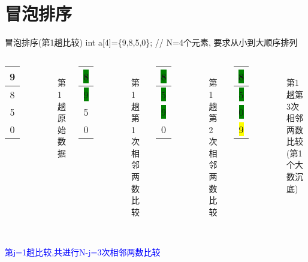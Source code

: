 \section{冒泡排序}

\begin{frame}{冒泡排序(第1趟比较)}
int a[4]=\{9,8,5,0\}; // N=4个元素, 要求从小到大顺序排列
\begin{columns}[T]
	\begin{tabular}{|c|}
		\hline 
		9 \\ 
		\hline 
		8 \\ 
		\hline 
		5 \\ 
		\hline
		0 \\
	    \hline 
	\end{tabular}\\ 
    第1趟原始数据
	\pause
	\begin{tabular}{|c|}
		\hline 
		\colorbox{green}{8} \\ 
		\hline 
		\colorbox{green}{9} \\ 
		\hline 
		5 \\ 
		\hline
		0 \\
		\hline  
	\end{tabular}\\ 
    第1趟第1次相邻两数比较
    \pause
    \begin{tabular}{|c|}
    	\hline 
    	\colorbox{green}{8} \\ 
    	\hline 
    	\colorbox{green}{5} \\ 
    	\hline 
    	\colorbox{green}{9} \\ 
    	\hline 
    	0 \\
    	\hline 
    \end{tabular}\\ 
    第1趟第2次相邻两数比较
    \pause
    \begin{tabular}{|c|}
    	\hline 
    	\colorbox{green}{8} \\ 
    	\hline 
    	\colorbox{green}{5} \\ 
    	\hline 
    	\colorbox{green}{0} \\ 
    	\hline 
    	\colorbox{yellow}{9} \\
    	\hline 
    \end{tabular}\\ 
    第1趟第3次相邻两数比较(第1个大数沉底)
\end{columns}
~\\
\textcolor{blue}{第j=1趟比较,共进行N-j=3次相邻两数比较}
\end{frame}

